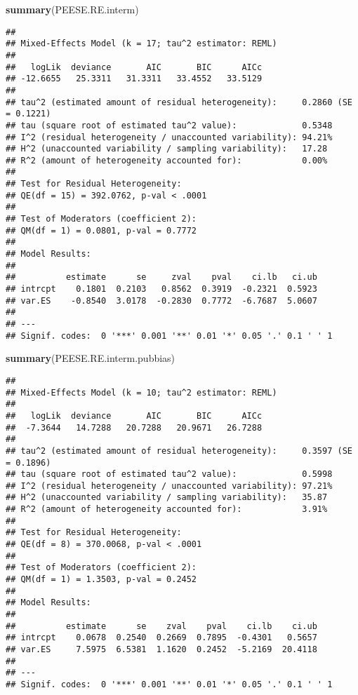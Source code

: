 \documentclass[]{book}
\newenvironment{Shaded}{\begin{snugshade}}{\end{snugshade}}
\newcommand{\KeywordTok}[1]{\textcolor[rgb]{0.13,0.29,0.53}{\textbf{#1}}}
\newcommand{\NormalTok}[1]{#1}
\theoremstyle{definition}
\theoremstyle{definition}
\theoremstyle{definition}
\theoremstyle{remark}
\begin{document}
\begin{Shaded}
\begin{Highlighting}[]
\KeywordTok{summary}\NormalTok{(PEESE.RE.interm)}
\end{Highlighting}
\end{Shaded}

\begin{verbatim}
## 
## Mixed-Effects Model (k = 17; tau^2 estimator: REML)
## 
##   logLik  deviance       AIC       BIC      AICc 
## -12.6655   25.3311   31.3311   33.4552   33.5129   
## 
## tau^2 (estimated amount of residual heterogeneity):     0.2860 (SE = 0.1221)
## tau (square root of estimated tau^2 value):             0.5348
## I^2 (residual heterogeneity / unaccounted variability): 94.21%
## H^2 (unaccounted variability / sampling variability):   17.28
## R^2 (amount of heterogeneity accounted for):            0.00%
## 
## Test for Residual Heterogeneity:
## QE(df = 15) = 392.0762, p-val < .0001
## 
## Test of Moderators (coefficient 2):
## QM(df = 1) = 0.0801, p-val = 0.7772
## 
## Model Results:
## 
##          estimate      se     zval    pval    ci.lb   ci.ub 
## intrcpt    0.1801  0.2103   0.8562  0.3919  -0.2321  0.5923    
## var.ES    -0.8540  3.0178  -0.2830  0.7772  -6.7687  5.0607    
## 
## ---
## Signif. codes:  0 '***' 0.001 '**' 0.01 '*' 0.05 '.' 0.1 ' ' 1
\end{verbatim}

\begin{Shaded}
\begin{Highlighting}[]
\KeywordTok{summary}\NormalTok{(PEESE.RE.interm.pubbias)}
\end{Highlighting}
\end{Shaded}

\begin{verbatim}
## 
## Mixed-Effects Model (k = 10; tau^2 estimator: REML)
## 
##   logLik  deviance       AIC       BIC      AICc 
##  -7.3644   14.7288   20.7288   20.9671   26.7288   
## 
## tau^2 (estimated amount of residual heterogeneity):     0.3597 (SE = 0.1896)
## tau (square root of estimated tau^2 value):             0.5998
## I^2 (residual heterogeneity / unaccounted variability): 97.21%
## H^2 (unaccounted variability / sampling variability):   35.87
## R^2 (amount of heterogeneity accounted for):            3.91%
## 
## Test for Residual Heterogeneity:
## QE(df = 8) = 370.0068, p-val < .0001
## 
## Test of Moderators (coefficient 2):
## QM(df = 1) = 1.3503, p-val = 0.2452
## 
## Model Results:
## 
##          estimate      se    zval    pval    ci.lb    ci.ub 
## intrcpt    0.0678  0.2540  0.2669  0.7895  -0.4301   0.5657    
## var.ES     7.5975  6.5381  1.1620  0.2452  -5.2169  20.4118    
## 
## ---
## Signif. codes:  0 '***' 0.001 '**' 0.01 '*' 0.05 '.' 0.1 ' ' 1
\end{verbatim}
\end{document}
